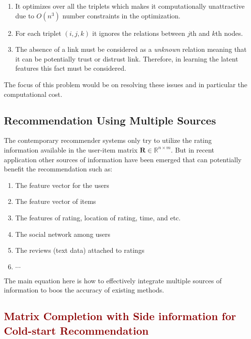 \documentclass[11pt]{article}
\newcommand{\bR}{\mathbf{R}}
\theoremstyle{definition}
\begin{document}
\begin{enumerate}
\item It optimizes over all the triplets which makes it computationally unattractive due to $O(n^3)$ number constraints in the optimization.
\item For each triplet $(i, j, k)$ it ignores the relations between $j$th and $k$th nodes.

\item The absence of a link must be considered as a \textit{unknown} relation meaning that it can be potentially trust or distrust link. Therefore, in learning the latent features this fact must be considered.
\end{enumerate}

The focus of this problem would be on resolving these issues and in particular the computational cost.



\subsection{Recommendation Using Multiple Sources}

The contemporary recommender systems only try to utilize the rating information available in the user-item matrix $\bR \in \mathbb{R}^{n \times m}$. But in recent application other sources of information have been emerged that can potentially benefit the recommendation such as:

\begin{enumerate}
\item The feature vector for the users
\item The feature vector of items
\item The features of rating, location of rating, time, and etc.
\item The social  network among users
\item The reviews (text data) attached to ratings
\item $\cdots$ 
\end{enumerate}

The main equation here is how to effectively integrate multiple sources of information to boos the accuracy of existing methods.


\subsection{\textcolor{DarkRed}{Matrix Completion with Side information for Cold-start Recommendation}}
\end{document}
